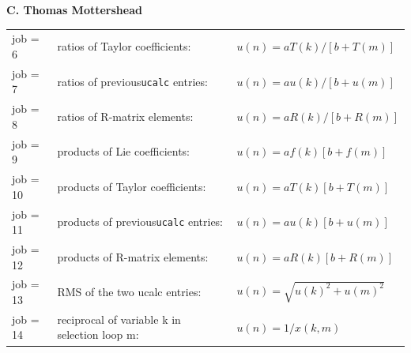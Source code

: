 \documentclass[11pt]{article} %
\newcommand{\vb}{\verb ;}
\newcommand{\edoc}{\end{document}}
\begin{document}
\begin{center}  {\bf C. Thomas Mottershead }
\begin{tabular}{l|l|l}
        job = 6 & ratios of Taylor coefficients: & $u(n)=aT(k)/[b+T(m)]$    \\         
        job = 7 & ratios of previous\vb ucalc; entries: & $u(n)=au(k)/[b+u(m)]$   \\                 
        job = 8 &  ratios of R-matrix elements: & $u(n)=aR(k)/[b+R(m)]$  \\ 
\hline            
        job = 9 &  products of Lie coefficients: & $u(n)=af(k)[b+f(m)]$ \\                
        job = 10 &  products of Taylor coefficients: & $u(n)=aT(k)[b+T(m)]$  \\           
        job = 11 &  products of previous\vb ucalc; entries: & $u(n)=au(k)[b+u(m)]$     \\              
         job = 12 &  products of R-matrix elements: & $u(n)=aR(k)[b+R(m)]$   \\  
\hline        
        job = 13 &  RMS of the two ucalc entries: &  $u(n)=\sqrt{u(k)^2+u(m)^2}$ \\
        job = 14 &  reciprocal of variable k in selection loop m: & $u(n)=1/x(k,m)$ \\
\end{tabular}





\end{center}
\end{document}
